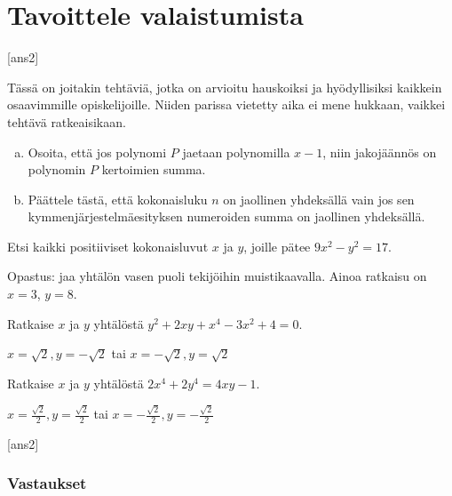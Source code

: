 \chapter{Tavoittele valaistumista}

[ans2]

Tässä on joitakin tehtäviä, jotka on arvioitu hauskoiksi ja hyödyllisiksi kaikkein osaavimmille opiskelijoille. Niiden parissa vietetty aika ei mene hukkaan, vaikkei tehtävä ratkeaisikaan.

\begin{tehtava}
    \begin{enumerate}[a)]
        \item Osoita, että jos polynomi $P$ jaetaan polynomilla $x-1$, niin jakojäännös on polynomin $P$ kertoimien summa.
        \item Päättele tästä, että kokonaisluku $n$ on jaollinen yhdeksällä vain jos sen kymmenjärjestelmäesityksen numeroiden summa on jaollinen yhdeksällä.
    \end{enumerate}
\end{tehtava}

\begin{tehtava} %
    Etsi kaikki positiiviset kokonaisluvut $x$ ja $y$, joille pätee $9x^2-y^2=17$.
    \begin{vastaus}
    Opastus: jaa yhtälön vasen puoli tekijöihin muistikaavalla. 
    Ainoa ratkaisu on $x = 3$, $y=8$.    
    \end{vastaus}
\end{tehtava}

\begin{tehtava} %
    Ratkaise $x$ ja $y$ yhtälöstä $y^2+2xy+x^4-3x^2+4=0$.
    \begin{vastaus}
        $x=\sqrt{2}, y=-\sqrt{2}$ tai $x=-\sqrt{2}, y=\sqrt{2}$
    \end{vastaus}
\end{tehtava}

\begin{tehtava} %
    Ratkaise $x$ ja $y$ yhtälöstä $2x^4+2y^4=4xy-1$.
    \begin{vastaus}
        $x=\frac{\sqrt{2}}{2}, y=\frac{\sqrt{2}}{2}$ tai $x=-\frac{\sqrt{2}}{2}, y=-\frac{\sqrt{2}}{2}$
    \end{vastaus}
\end{tehtava}

[ans2]

\subsection*{Vastaukset}

